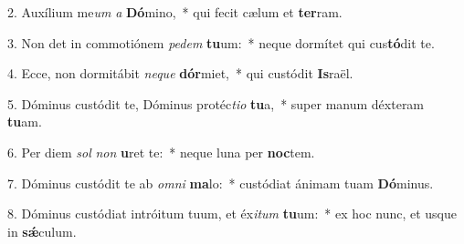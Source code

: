 2. Auxílium me\textit{um} \textit{a} \textbf{Dó}mino,~*  qui fecit cælum et \textbf{ter}ram.\

3. Non det in commotiónem \textit{pe}\textit{dem} \textbf{tu}um:~*  neque dormítet qui cus\textbf{tó}dit te.\

4. Ecce, non dormitábit \textit{ne}\textit{que} \textbf{dór}miet,~*  qui custódit \textbf{Is}raël.\

5. Dóminus custódit te, Dóminus protéc\textit{ti}\textit{o} \textbf{tu}a,~*  super manum déxteram \textbf{tu}am.\

6. Per diem \textit{sol} \textit{non} \textbf{u}ret te:~*  neque luna per \textbf{noc}tem.\

7. Dóminus custódit te ab \textit{om}\textit{ni} \textbf{ma}lo:~*  custódiat ánimam tuam \textbf{Dó}minus.\

8. Dóminus custódiat intróitum tuum, et éx\textit{i}\textit{tum} \textbf{tu}um:~*  ex hoc nunc, et usque in \textbf{sǽ}culum.\

